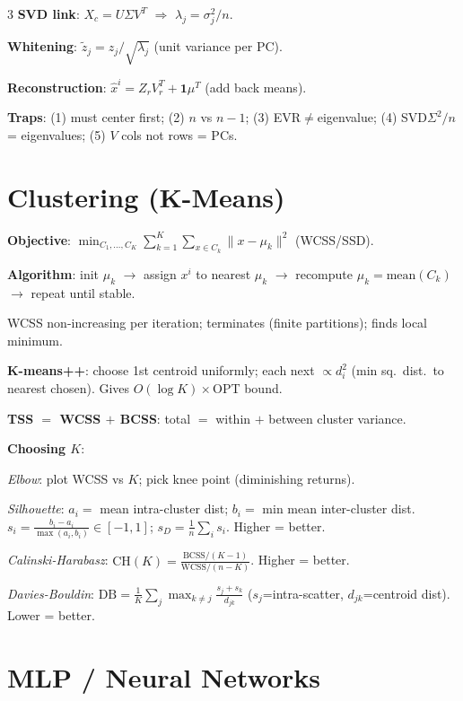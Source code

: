 \documentclass[8pt,fleqn]{extarticle}
\begin{document}
\begin{multicols}{3}
\textbf{SVD link}: $X_c=U\Sigma V^T$ $\Rightarrow$ $\lambda_j=\sigma_j^2/n$.

\textbf{Whitening}: $\tilde z_j=z_j/\sqrt{\lambda_j}$ (unit variance per PC).

\textbf{Reconstruction}: $\hat x^i=Z_r V_r^T+\mathbf{1}\mu^T$ (add back means).

\textbf{Traps}: (1) must center first; (2) $n$ vs $n-1$; (3) EVR$\ne$eigenvalue; (4) SVD$\Sigma^2/n$ = eigenvalues; (5) $V$ cols not rows = PCs.


\section*{Clustering (K-Means)}

\textbf{Objective}: $\min_{C_1,\ldots,C_K}\sum_{k=1}^K\sum_{x\in C_k}\|x-\mu_k\|^2$ (WCSS/SSD).

\textbf{Algorithm}: init $\mu_k$ $\to$ assign $x^i$ to nearest $\mu_k$ $\to$ recompute $\mu_k=\text{mean}(C_k)$ $\to$ repeat until stable.

WCSS non-increasing per iteration; terminates (finite partitions); finds local minimum.

\textbf{K-means++}: choose 1st centroid uniformly; each next $\propto d_i^2$ (min sq.\ dist.\ to nearest chosen). Gives $O(\log K)\times$OPT bound.

\textbf{TSS $=$ WCSS $+$ BCSS}: total $=$ within $+$ between cluster variance.

\textbf{Choosing $K$}:

\textit{Elbow}: plot WCSS vs $K$; pick knee point (diminishing returns).

\textit{Silhouette}: $a_i=$ mean intra-cluster dist; $b_i=$ min mean inter-cluster dist.
$s_i=\frac{b_i-a_i}{\max(a_i,b_i)}\in[-1,1]$; $s_D=\frac1n\sum_i s_i$. Higher = better.

\textit{Calinski-Harabasz}: $\text{CH}(K)=\frac{\text{BCSS}/(K-1)}{\text{WCSS}/(n-K)}$. Higher = better.

\textit{Davies-Bouldin}: $\text{DB}=\frac1K\sum_j\max_{k\ne j}\frac{s_j+s_k}{d_{jk}}$ ($s_j$=intra-scatter, $d_{jk}$=centroid dist). Lower = better.


\section*{MLP / Neural Networks}


\end{multicols}
\end{document}
